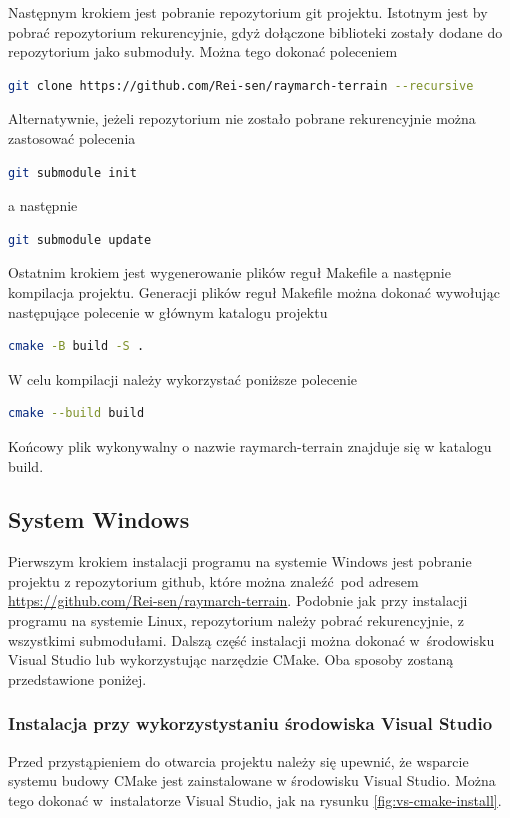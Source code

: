 Następnym krokiem jest pobranie repozytorium git projektu. Istotnym jest by pobrać repozytorium rekurencyjnie, gdyż dołączone biblioteki zostały dodane do repozytorium jako submoduły. Można tego dokonać poleceniem
\begin{lstlisting}[language=bash]
  git clone https://github.com/Rei-sen/raymarch-terrain --recursive
\end{lstlisting}
Alternatywnie, jeżeli repozytorium nie zostało pobrane rekurencyjnie można zastosować polecenia
\begin{lstlisting}[language=bash]
  git submodule init
\end{lstlisting}
a następnie
\begin{lstlisting}[language=bash]
  git submodule update
\end{lstlisting}
Ostatnim krokiem jest wygenerowanie plików reguł Makefile a następnie
kompilacja projektu. Generacji plików reguł Makefile można dokonać wywołując następujące polecenie w głównym katalogu projektu
\begin{lstlisting}[language=bash]
  cmake -B build -S .
\end{lstlisting}
W celu kompilacji należy wykorzystać poniższe polecenie
\begin{lstlisting}[language=bash]
  cmake --build build
\end{lstlisting}
Końcowy plik wykonywalny o nazwie raymarch-terrain znajduje się w katalogu build.
\subsection{System Windows}
Pierwszym krokiem instalacji programu na systemie Windows jest pobranie
projektu z repozytorium github, które można znaleźć pod adresem
\url{https://github.com/Rei-sen/raymarch-terrain}. Podobnie jak przy instalacji programu na systemie Linux, repozytorium należy pobrać rekurencyjnie, z wszystkimi submodułami.
Dalszą część instalacji można dokonać w~środowisku Visual Studio lub
wykorzystując narzędzie CMake. Oba sposoby zostaną przedstawione poniżej.
\subsubsection{Instalacja przy wykorzystystaniu środowiska Visual Studio}
Przed przystąpieniem do otwarcia projektu należy się upewnić, że
wsparcie systemu budowy CMake jest zainstalowane w środowisku Visual Studio.
Można tego dokonać w~instalatorze Visual Studio, jak na rysunku \ref{fig:vs-cmake-install}.


